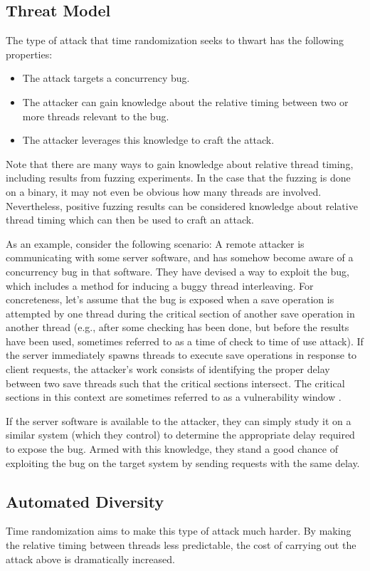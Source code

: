 \subsection{Threat Model}
The type of attack that time randomization seeks to thwart has the following properties:
\begin{itemize}
	\item The attack targets a concurrency bug.
	\item The attacker can gain knowledge about the relative timing between two
  or more threads relevant to the bug.
	\item The attacker leverages this knowledge to craft the attack.
\end{itemize}
Note that there are many ways to gain knowledge about relative thread timing, including results from fuzzing experiments.
In the case that the fuzzing is done on a binary, it may not even be obvious how many threads are involved.
Nevertheless, positive fuzzing results can be considered knowledge about relative thread timing which can then be used to craft an attack.

As an example, consider the following scenario:
A remote attacker is communicating with some server software, and has somehow become aware of a concurrency bug in that software.
They have devised a way to exploit the bug, which includes a method for inducing a buggy thread interleaving.
For concreteness, let's assume that the bug is exposed when a save operation
is attempted by one thread during the critical section of another save
operation in another thread (e.g., after some checking has been done, but before the results have been used, sometimes referred to as a time of check to time of use attack).
If the server immediately spawns threads to execute save operations in response to client requests, the attacker's work consists of identifying the proper delay between two save threads such that the critical sections intersect.
The critical sections in this context are sometimes referred to as a vulnerability window \cite{Yang2012}.

If the server software is available to the attacker, they can simply study it on a similar system (which they control) to determine the appropriate delay required to expose the bug.
Armed with this knowledge, they stand a good chance of exploiting the bug on the target system by sending requests with the same delay.
\subsection{Automated Diversity}\label{automated-diversity}
Time randomization aims to make this type of attack much harder.
By making the relative timing between threads less predictable, the cost of carrying out the attack above is dramatically increased.

